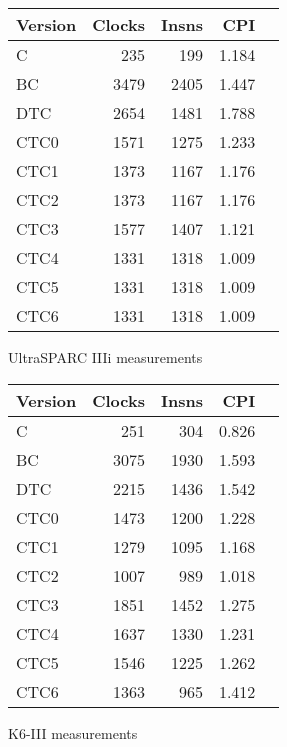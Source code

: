 \documentclass[10pt,a4paper]{article}
\begin{document}
\begin{figure}[htb]
\begin{center}
\begin{tabular}{|@{~}l|r|r|r|r|}
\hline
Version & Clocks & Insns & CPI \\
\hline
C    &  235 &  199 & 1.184 \\
BC   & 3479 & 2405 & 1.447 \\
DTC  & 2654 & 1481 & 1.788 \\
CTC0 & 1571 & 1275 & 1.233 \\
CTC1 & 1373 & 1167 & 1.176 \\
CTC2 & 1373 & 1167 & 1.176 \\
CTC3 & 1577 & 1407 & 1.121 \\
CTC4 & 1331 & 1318 & 1.009 \\
CTC5 & 1331 & 1318 & 1.009 \\
CTC6 & 1331 & 1318 & 1.009 \\
\hline
\end{tabular}
\end{center}
\caption{UltraSPARC IIIi measurements}
\label{fig:measurements-us3i}
\end{figure}

\begin{figure}[htb]
\begin{center}
\begin{tabular}{|@{~}l|r|r|r|r|}
\hline
Version & Clocks & Insns & CPI \\
\hline
C    &  251 &  304 & 0.826 \\
BC   & 3075 & 1930 & 1.593 \\
DTC  & 2215 & 1436 & 1.542 \\
CTC0 & 1473 & 1200 & 1.228 \\
CTC1 & 1279 & 1095 & 1.168 \\
CTC2 & 1007 &  989 & 1.018 \\
CTC3 & 1851 & 1452 & 1.275 \\
CTC4 & 1637 & 1330 & 1.231 \\
CTC5 & 1546 & 1225 & 1.262 \\
CTC6 & 1363 &  965 & 1.412 \\
\hline
\end{tabular}
\end{center}
\caption{K6-III measurements}
\label{fig:measurements-k63}
\end{figure}
\end{document}
